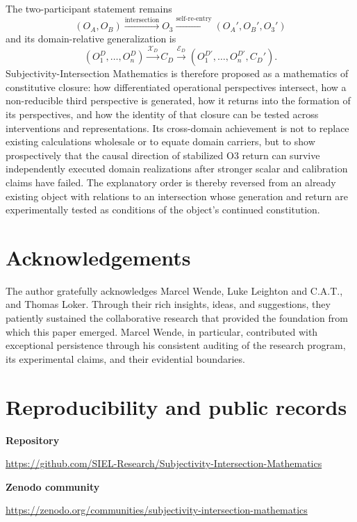 \documentclass[11pt,a4paper]{article}
\newcommand{\OA}{\ensuremath{O_{A}}}
\newcommand{\OB}{\ensuremath{O_{B}}}
\newcommand{\Othree}{\ensuremath{O_{3}}}
\begin{document}
The two-participant statement remains
\[
 \boxed{(\OA,\OB)\xrightarrow{\text{intersection}}\Othree
 \xrightarrow{\text{self-re-entry}}(\OA',\OB',\Othree')}
\]
and its domain-relative generalization is
\[
 \boxed{(O_1^D,\ldots,O_n^D)\xrightarrow{\mathcal X_D}C_D
 \xrightarrow{\mathcal E_D}(O_1^{D\prime},\ldots,O_n^{D\prime},C_D')}.
\]
Subjectivity-Intersection Mathematics is therefore proposed as a mathematics of constitutive closure: how differentiated operational perspectives intersect, how a non-reducible third perspective is generated, how it returns into the formation of its perspectives, and how the identity of that closure can be tested across interventions and representations. Its cross-domain achievement is not to replace existing calculations wholesale or to equate domain carriers, but to show prospectively that the causal direction of stabilized O3 return can survive independently executed domain realizations after stronger scalar and calibration claims have failed. The explanatory order is thereby reversed from an already existing object with relations to an intersection whose generation and return are experimentally tested as conditions of the object's continued constitution.

\section*{Acknowledgements}

The author gratefully acknowledges Marcel Wende, Luke Leighton and C.A.T., and Thomas Loker. Through their rich insights, ideas, and suggestions, they patiently sustained the collaborative research that provided the foundation from which this paper emerged. Marcel Wende, in particular, contributed with exceptional persistence through his consistent auditing of the research program, its experimental claims, and their evidential boundaries.

\appendix
\section{Reproducibility and public records}

\noindent\textbf{Repository}
\begin{center}
\small\url{https://github.com/SIEL-Research/Subjectivity-Intersection-Mathematics}
\end{center}

\noindent\textbf{Zenodo community}
\begin{center}
\small\url{https://zenodo.org/communities/subjectivity-intersection-mathematics}
\end{center}
\end{document}
